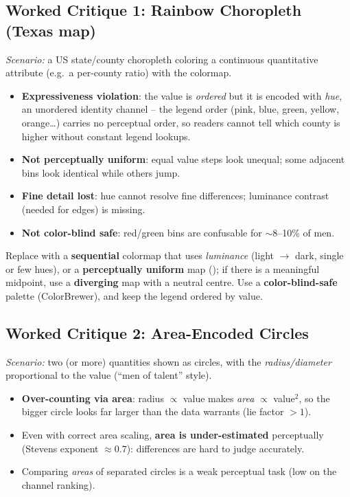 \subsection{Worked Critique 1: Rainbow Choropleth (Texas map)}

\textit{Scenario:} a US state/county choropleth coloring a continuous
quantitative attribute (e.g.\ a per-county ratio) with the 
colormap.

\begin{keybox}[Critique]
\begin{itemize}
  \item \textbf{Expressiveness violation}: the value is \emph{ordered} but it is
    encoded with \emph{hue}, an unordered identity channel -- the legend order
    (pink, blue, green, yellow, orange\ldots) carries no perceptual order, so
    readers cannot tell which county is higher without constant legend
    lookups.
  \item \textbf{Not perceptually uniform}: equal value steps look unequal;
    some adjacent bins look identical while others jump.
  \item \textbf{Fine detail lost}: hue cannot resolve fine differences;
    luminance contrast (needed for edges) is missing.
  \item \textbf{Not color-blind safe}: red/green bins are confusable for
    $\sim$8--10\% of men.
\end{itemize}
\end{keybox}

\begin{keybox}[Fix]
Replace with a \textbf{sequential} colormap that uses \emph{luminance} (light
$\to$ dark, single or few hues), or a \textbf{perceptually uniform} map
(); if there is a meaningful midpoint, use a \textbf{diverging}
map with a neutral centre. Use a \textbf{color-blind-safe} palette
(ColorBrewer), and keep the legend ordered by value.
\end{keybox}

\subsection{Worked Critique 2: Area-Encoded Circles}

\textit{Scenario:} two (or more) quantities shown as circles, with the
\emph{radius/diameter} proportional to the value (``men of talent'' style).

\begin{keybox}[Critique]
\begin{itemize}
  \item \textbf{Over-counting via area}: radius $\propto$ value makes
    \emph{area} $\propto$ value$^2$, so the bigger circle looks far larger than
    the data warrants (lie factor $>1$).
  \item Even with correct area scaling, \textbf{area is under-estimated}
    perceptually (Stevens exponent $\approx 0.7$): differences are hard to
    judge accurately.
  \item Comparing \emph{areas} of separated circles is a weak perceptual task
    (low on the channel ranking).
\end{itemize}
\end{keybox}

